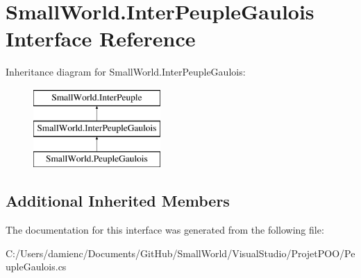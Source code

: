 \hypertarget{interface_small_world_1_1_inter_peuple_gaulois}{\section{Small\-World.\-Inter\-Peuple\-Gaulois Interface Reference}
\label{interface_small_world_1_1_inter_peuple_gaulois}
}
Inheritance diagram for Small\-World.\-Inter\-Peuple\-Gaulois\-:\begin{figure}[H]
\begin{center}
\leavevmode
\includegraphics[height=3.000000cm]{interface_small_world_1_1_inter_peuple_gaulois}
\end{center}
\end{figure}
\subsection*{Additional Inherited Members}


The documentation for this interface was generated from the following file\-:\begin{DoxyCompactItemize}
\item 
C\-:/\-Users/damienc/\-Documents/\-Git\-Hub/\-Small\-World/\-Visual\-Studio/\-Projet\-P\-O\-O/Peuple\-Gaulois.\-cs\end{DoxyCompactItemize}
